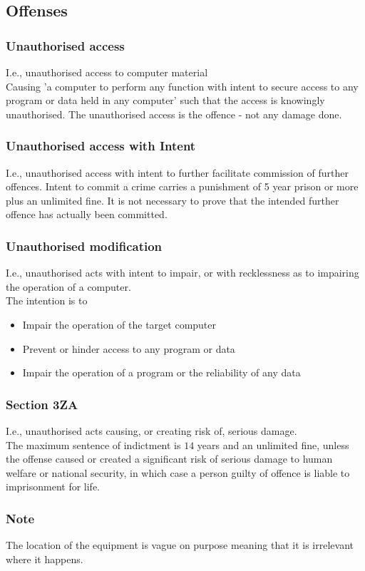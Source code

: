 \documentclass[a4paper]{article}
\theoremstyle{plain}
\theoremstyle{definition}
\theoremstyle{remark}
\begin{document}
\subsection{Offenses}

\subsubsection{Unauthorised access}
I.e., unauthorised access to computer material \\
Causing 'a computer to perform any function with intent to secure access to any program or data held in any computer' such that the access is knowingly unauthorised. The unauthorised access is the offence - not any damage done.
\subsubsection{Unauthorised access with Intent}
I.e., unauthorised access with intent to further facilitate commission of further offences. Intent to commit a crime carries a punishment of 5 year prison or more plus an unlimited fine. It is not necessary to prove that the intended further offence has actually been committed.
\subsubsection{Unauthorised modification}
I.e., unauthorised acts with intent to impair, or with recklessness as to impairing the operation of a computer. \\
The intention is to
\begin{itemize}
	\item Impair the operation of the target computer
	\item Prevent or hinder access to any program or data
	\item Impair the operation of a program or the reliability of any data
\end{itemize}
\subsubsection{Section 3ZA}
I.e., unauthorised acts causing, or creating risk of, serious damage. \\
The maximum sentence of indictment is $14$ years and an unlimited fine, unless the offense caused or created a significant risk of serious damage to human welfare or national security, in which case a person guilty of offence is liable to imprisonment for life.
\subsubsection{Note}
The location of the equipment is vague on purpose meaning that it is irrelevant where it happens.
\end{document}
